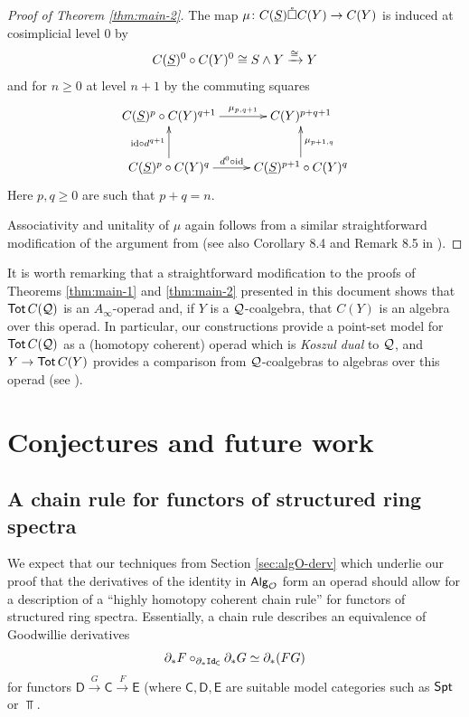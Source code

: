 \begin{proof}[Proof of Theorem \ref{thm:main-2}]
    The map $\mu \colon C(\underline{S})\mathring{\square} C(Y)\to C(Y)$ is induced at cosimplicial level $0$ by \[ C(\underline{S})^0\circ C(Y)^0\cong S\wedge Y\xrightarrow{\cong} Y\] and for $n\geq 0$ at level $n+1$ by the commuting squares \[\xymatrix{
        C(\uS)^{p}\circ C(Y)^{q+1} \ar[r]^-{\mu_{p,q+1}} 
        &
        C(Y)^{p+q+1}
        \\
        C(\uS)^{p} \circ C(Y)^{q} \ar[u]^-{\id \circ d^{q+1}} \ar[r]^-{d^0 \circ \id}
        &
        C(\uS)^{p+1}\circ C(Y)^{q} \ar[u]_-{\mu_{p+1,q}}
    }\]
    Here $p,q\geq 0$ are such that $p+q=n$.
    
    Associativity and unitality of $\mu$ again follows from a similar straightforward modification of the  argument from \cite[Proposition 5.8]{Clark-1} (see also Corollary 8.4 and Remark 8.5 in  \cite{Clark-1}). 
\end{proof}

\begin{remark}
    It is worth remarking that a straightforward modification to the proofs of Theorems \ref{thm:main-1} and \ref{thm:main-2} presented in this document shows that $\operatorname{\mathsf{Tot}} C(\mathcal{Q})$ is an $A_{\infty}$-operad and, if $Y$ is a $\mathcal{Q}$-coalgebra, that $C(Y)$ is an algebra over this operad. In particular, our constructions provide a point-set model for $\operatorname{\mathsf{Tot}} C(\mathcal{Q})$ as a (homotopy coherent) operad which is \textit{Koszul dual} to $\mathcal{Q}$, and $Y\to \operatorname{\mathsf{Tot}} C(Y)$ provides a comparison from $\mathcal{Q}$-coalgebras to algebras over this operad (see \cite{FG}). 
\end{remark}
    
\section{Conjectures and future work}
\label{sec:conj}

\subsection{A chain rule for functors of structured ring spectra}
We expect that our techniques from Section \ref{sec:algO-derv} which underlie our proof that the derivatives of the identity in ${\mathsf{Alg}_{\mathcal{O}}}$ form an operad should allow for a description of a ``highly homotopy coherent chain rule'' for functors of structured ring spectra. Essentially, a chain rule describes an equivalence of Goodwillie derivatives \begin{equation} \label{eq:chain-rule} \partial_*F \circ_{\partial_*\mathtt{Id}_{\mathsf{C}}} \partial_*G \simeq \partial_*(FG)\end{equation} for functors $\mathsf{D} \xrightarrow{G} \mathsf{C} \xrightarrow{F} \mathsf{E}$ (where $\mathsf{C},\mathsf{D},\mathsf{E}$ are suitable model categories such as $\mathsf{Spt}$ or $\Top$.

